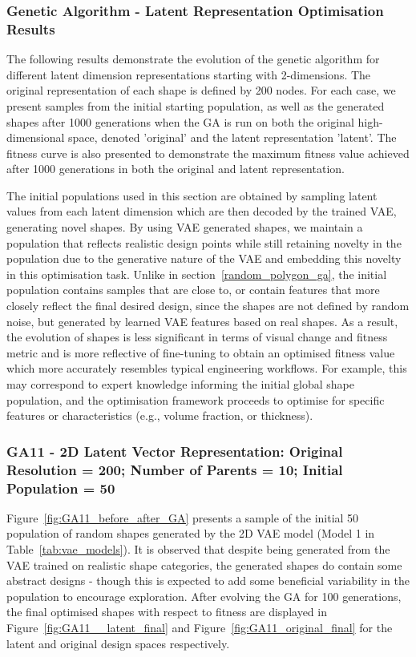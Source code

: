 \documentclass{article}
\begin{document}
\subsubsection{Genetic Algorithm - Latent Representation Optimisation Results}\label{GA-optimisation-latent}
The following results demonstrate the evolution of the genetic algorithm for different latent dimension representations starting with 2-dimensions. The original representation of each shape is defined by 200 nodes. For each case, we present samples from the initial starting population, as well as the generated shapes after 1000 generations when the GA is run on both the original high-dimensional space, denoted 'original' and the latent representation 'latent'. The fitness curve is also presented to demonstrate the maximum fitness value achieved after 1000 generations in both the original and latent representation.

The initial populations used in this section are obtained by sampling latent values from each latent dimension which are then decoded by the trained VAE, generating novel shapes. By using VAE generated shapes, we maintain a population that reflects realistic design points while still retaining novelty in the population due to the generative nature of the VAE and embedding this novelty in this optimisation task. Unlike in section~\ref{random_polygon_ga}, the initial population contains samples that are close to, or contain features that more closely reflect the final desired design, since the shapes are not defined by random noise, but generated by learned VAE features based on real shapes. As a result, the evolution of shapes is less significant in terms of visual change and fitness metric and is more reflective of fine-tuning to obtain an optimised fitness value which more accurately resembles typical engineering workflows. For example, this may correspond to expert knowledge informing the initial global shape population, and the optimisation framework proceeds to optimise for specific features or characteristics (e.g., volume fraction, or thickness).

\subsubsection*{GA11 - 2D Latent Vector Representation: Original Resolution = 200; Number of Parents = 10; Initial Population = 50}

Figure~\ref{fig:GA11_before_after_GA} presents a sample of the initial 50 population of random shapes generated by the 2D VAE model (Model 1 in Table~\ref{tab:vae_models}). It is observed that despite being generated from the VAE trained on realistic shape categories, the generated shapes do contain some abstract designs - though this is expected to add some beneficial variability in the population to encourage exploration. After evolving the GA for 100 generations, the final optimised shapes with respect to fitness are displayed in Figure~\ref{fig:GA11__latent_final} and Figure~\ref{fig:GA11_original_final} for the latent and original design spaces respectively.
\end{document}
